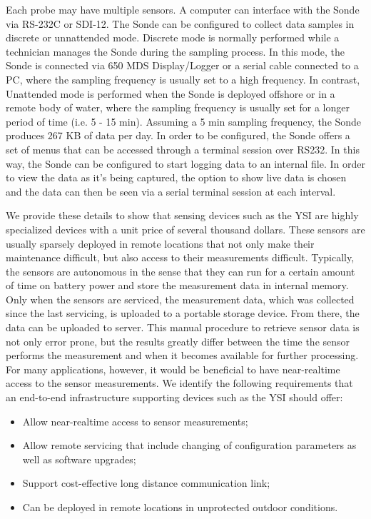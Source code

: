 \documentclass[conference]{IEEEtran}
\begin{document}
Each probe may have multiple sensors.  A computer can interface with
the Sonde via RS-232C or SDI-12. The Sonde can be configured to
collect data samples in discrete or unnattended mode.  Discrete mode
is normally performed while a technician manages the Sonde during the
sampling process. In this mode, the Sonde is connected via 650
MDS Display/Logger or a serial cable connected to a PC, where the sampling
frequency is usually set to a high frequency. In contrast, Unattended
mode is performed when the Sonde is deployed offshore or in a
remote body of water, where the sampling frequency is usually set for a
longer period of time (i.e. 5 - 15 min). Assuming a 5 min sampling
frequency, the Sonde produces 267 KB of data per day.
In order to be configured,
the Sonde offers a set of menus that can be accessed through a terminal session
over RS232. In this way, the Sonde can be configured to
start logging data to an internal file. In order to view the data as it's
being captured, the option to show live data is chosen and the data can then be 
seen via a serial terminal session at each interval.

We provide these details to show that sensing devices such as the YSI
are highly specialized devices with a unit price of several thousand
dollars. These sensors are usually sparsely deployed in remote
locations that not only make their maintenance difficult, but also
access to their measurements difficult.  Typically, the sensors are autonomous
in the sense that they can run for a certain amount of time on battery power and
store the measurement data in internal memory. Only when the sensors
are serviced, the measurement data, which was collected since the last
servicing, is uploaded to a portable storage device. From there, the
data can be uploaded to server. This manual procedure to retrieve
sensor data is not only error prone, but the results greatly differ
between the time the sensor performs the measurement and when
it becomes available for further processing. For many applications,
however, it would be beneficial to have near-realtime access to the
sensor measurements. We identify the following requirements that an
end-to-end infrastructure supporting devices such as the YSI should
offer:

\begin{itemize}
\item Allow near-realtime access to sensor measurements;
\item Allow remote servicing that include changing of configuration
  parameters as well as software upgrades;
\item Support cost-effective long distance communication link;
\item Can be deployed in remote locations in unprotected outdoor
  conditions.
\end{itemize}
\end{document}

